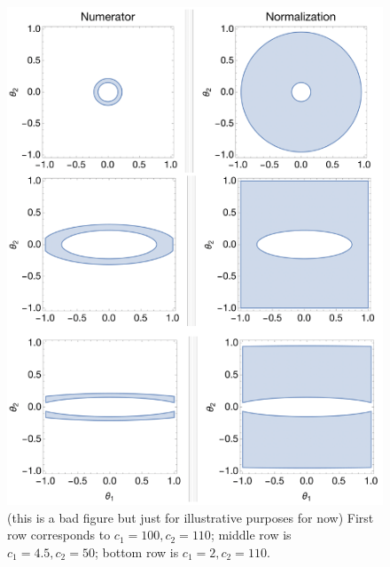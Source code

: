 \documentclass[11pt]{article}
\begin{document}
\begin{figure}[h]
    \includegraphics[scale=0.5]{figs/ellipses.png}
    \centering
    \caption{(this is a bad figure but just for illustrative purposes for now) First row corresponds to $c_1 = 100, c_2=110$; middle row is $c_1 = 4.5, c_2=50$; bottom row is $c_1 = 2, c_2=110$.}
    \label{fig:2d-integration-area}
\end{figure}
\end{document}
